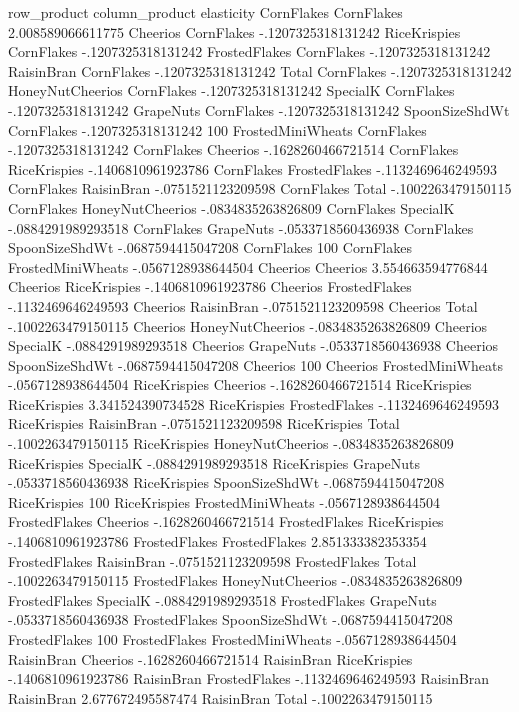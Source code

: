 row_product	column_product	elasticity
CornFlakes	CornFlakes	2.008589066611775
Cheerios	CornFlakes	-.1207325318131242
RiceKrispies	CornFlakes	-.1207325318131242
FrostedFlakes	CornFlakes	-.1207325318131242
RaisinBran	CornFlakes	-.1207325318131242
Total	CornFlakes	-.1207325318131242
HoneyNutCheerios	CornFlakes	-.1207325318131242
SpecialK	CornFlakes	-.1207325318131242
GrapeNuts	CornFlakes	-.1207325318131242
SpoonSizeShdWt	CornFlakes	-.1207325318131242
100%
FrostedMiniWheats	CornFlakes	-.1207325318131242
CornFlakes	Cheerios	-.1628260466721514
CornFlakes	RiceKrispies	-.1406810961923786
CornFlakes	FrostedFlakes	-.1132469646249593
CornFlakes	RaisinBran	-.0751521123209598
CornFlakes	Total	-.1002263479150115
CornFlakes	HoneyNutCheerios	-.0834835263826809
CornFlakes	SpecialK	-.0884291989293518
CornFlakes	GrapeNuts	-.0533718560436938
CornFlakes	SpoonSizeShdWt	-.0687594415047208
CornFlakes	100%
CornFlakes	FrostedMiniWheats	-.0567128938644504
Cheerios	Cheerios	3.554663594776844
Cheerios	RiceKrispies	-.1406810961923786
Cheerios	FrostedFlakes	-.1132469646249593
Cheerios	RaisinBran	-.0751521123209598
Cheerios	Total	-.1002263479150115
Cheerios	HoneyNutCheerios	-.0834835263826809
Cheerios	SpecialK	-.0884291989293518
Cheerios	GrapeNuts	-.0533718560436938
Cheerios	SpoonSizeShdWt	-.0687594415047208
Cheerios	100%
Cheerios	FrostedMiniWheats	-.0567128938644504
RiceKrispies	Cheerios	-.1628260466721514
RiceKrispies	RiceKrispies	3.341524390734528
RiceKrispies	FrostedFlakes	-.1132469646249593
RiceKrispies	RaisinBran	-.0751521123209598
RiceKrispies	Total	-.1002263479150115
RiceKrispies	HoneyNutCheerios	-.0834835263826809
RiceKrispies	SpecialK	-.0884291989293518
RiceKrispies	GrapeNuts	-.0533718560436938
RiceKrispies	SpoonSizeShdWt	-.0687594415047208
RiceKrispies	100%
RiceKrispies	FrostedMiniWheats	-.0567128938644504
FrostedFlakes	Cheerios	-.1628260466721514
FrostedFlakes	RiceKrispies	-.1406810961923786
FrostedFlakes	FrostedFlakes	2.851333382353354
FrostedFlakes	RaisinBran	-.0751521123209598
FrostedFlakes	Total	-.1002263479150115
FrostedFlakes	HoneyNutCheerios	-.0834835263826809
FrostedFlakes	SpecialK	-.0884291989293518
FrostedFlakes	GrapeNuts	-.0533718560436938
FrostedFlakes	SpoonSizeShdWt	-.0687594415047208
FrostedFlakes	100%
FrostedFlakes	FrostedMiniWheats	-.0567128938644504
RaisinBran	Cheerios	-.1628260466721514
RaisinBran	RiceKrispies	-.1406810961923786
RaisinBran	FrostedFlakes	-.1132469646249593
RaisinBran	RaisinBran	2.677672495587474
RaisinBran	Total	-.1002263479150115
